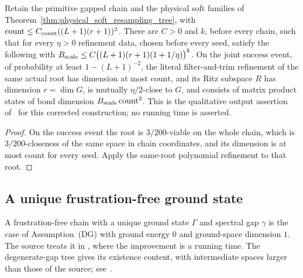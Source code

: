 \begin{lemma}
    \label{thm:physical_soft_tree_refined_ritz}
    \leanok
    Retain the primitive gapped chain and the physical soft families of
    Theorem~\ref{thm:physical_soft_resampling_tree}, with
    $\mathrm{count}\le C_{\rm count}((L+1)(r+1))^2$. There are $C>0$ and $k$,
    before every chain, such that for every $\eta>0$ refinement data, chosen
    before every seed, satisfy the following with
    $B_{\rm scale}\le C\bigl((L+1)(r+1)(1+1/\eta)\bigr)^k$. On the joint success
    event, of probability at least $1-(L+1)^{-2}$, the literal filter-and-trim
    refinement of the same actual root has dimension at most $\mathrm{count}$,
    and its Ritz subspace $R$ has dimension $r=\dim G$, is mutually
    $\eta/2$-close to $G$, and consists of matrix product states of bond
    dimension $B_{\rm scale}\,\mathrm{count}^2$. This is the qualitative
    output assertion of~\cite[Theorem~\texttt{t:alg1}, lines
        1777--1818]{Arad2016RigorousRG} for this corrected construction; no
    running time is asserted.
\end{lemma}
\begin{proof}\leanok
    On the success event the root is $3/200$-viable on the whole chain, which
    is $3/200$-closeness of the same space in chain coordinates, and its
    dimension is at most $\mathrm{count}$ for every seed. Apply the same-root
    polynomial refinement to that root.
\end{proof}

\subsection{A unique frustration-free ground state}

A frustration-free chain with a unique ground state $\Gamma$ and spectral
gap $\gamma$ is the case of Assumption~(DG) with ground energy $0$ and
ground-space dimension $1$. The source treats it in
\cite[Theorem~\texttt{t:unique}, lines 1829--1855]{Arad2016RigorousRG},
where the improvement is a running time. The degenerate-gap tree gives its
existence content, with intermediate spaces larger than those of the
source; see~\cite{gap:alvv16_unique_ground_state_tree}.

